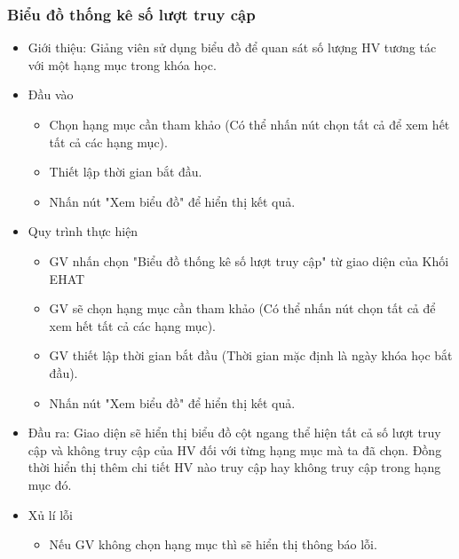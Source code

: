 \subsubsection{Biểu đồ thống kê số lượt truy cập}
\begin{itemize}
	\item Giới thiệu: Giảng viên sử dụng biểu đồ để quan sát số lượng HV tương tác với một hạng mục trong khóa học.
	\item Đầu vào
	\begin{itemize}
		\item Chọn hạng mục cần tham khảo (Có thể nhấn nút chọn tất cả để xem hết tất cả các hạng mục).
		\item Thiết lập thời gian bắt đầu.
		\item Nhấn nút "Xem biểu đồ" để hiển thị kết quả.
	\end{itemize}
	\item Quy trình thực hiện
	\begin{itemize}
		\item GV nhấn chọn "Biểu đồ thống kê số lượt truy cập" từ giao diện của Khối EHAT
		\item GV sẽ chọn hạng mục cần tham khảo (Có thể nhấn nút chọn tất cả để xem hết tất cả các hạng mục).
		\item GV thiết lập thời gian bắt đầu (Thời gian mặc định là ngày khóa học bắt đầu).
		\item Nhấn nút "Xem biểu đồ" để hiển thị kết quả.
	\end{itemize}
	\item Đầu ra: Giao diện sẽ hiển thị biểu đồ cột ngang thể hiện tất cả số lượt truy cập và không truy cập của HV đối với từng hạng mục mà ta đã chọn. Đồng thời hiển thị thêm chi tiết HV nào truy cập hay không truy cập trong hạng mục đó.
	\item Xủ lí lỗi
	\begin{itemize}
		\item Nếu GV không chọn hạng mục thì sẽ hiển thị thông báo lỗi.
	\end{itemize}
\end{itemize}
